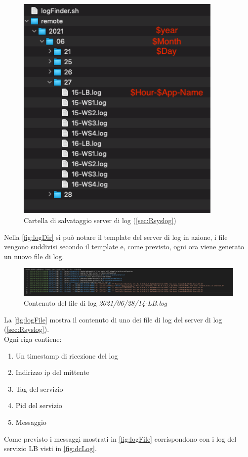 \documentclass[../DocumentazioneProgetto.tex]{subfiles}
\begin{document}
	\begin{figure}[ht]
		\includegraphics[width=10cm]{images/logDir.png}
		\centering
		\caption{Cartella di salvataggio server di log (\autoref{sec:Rsyslog})}
		\label{fig:logDir}
	\end{figure}
	Nella \autoref{fig:logDir} si può notare il template del server di log in azione, i file vengono suddivisi secondo il template e, come previsto, ogni ora viene generato un nuovo file di log.

	\begin{figure}[ht]
		\includegraphics[width=15cm]{images/logFile.png}
		\centering
		\caption{Contenuto del file di log \textit{2021/06/28/14-LB.log}}
		\label{fig:logFile}
	\end{figure}
	La \autoref{fig:logFile} mostra il contenuto di uno dei file di log del server di log (\autoref{sec:Rsyslog}).\\
	Ogni riga contiene:
	\begin{enumerate}
		\item Un timestamp di ricezione del log
		\item Indirizzo ip del mittente
		\item Tag del servizio
		\item Pid del servizio
		\item Messaggio
	\end{enumerate}
	Come previsto i messaggi mostrati in \autoref{fig:logFile} corrispondono con i log del servizio LB visti in \autoref{fig:dcLog}.
\end{document}
